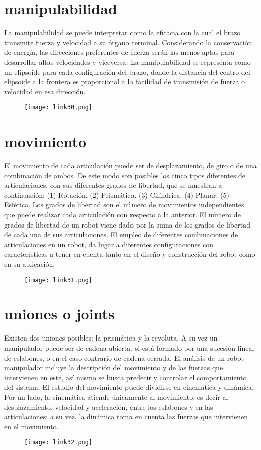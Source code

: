 \documentclass[11pt,a4paper,oldfontcommands,oneside]{memoir}
\begin{document}
\section{manipulabilidad}
La manipulabilidad se puede interpretar como la eficacia con la cual el brazo transmite fuerza y velocidad a su órgano terminal. Considerando la conservación de energía, las direcciones preferentes de fuerza serán las menos aptas para desarrollar altas velocidades y viceversa. 
La manipulabilidad se representa como un elipsoide para cada configuración del brazo, donde la distancia del centro del elipsoide a la frontera es proporcional a la facilidad de transmisión de fuerza o velocidad en esa dirección. 

\begin{figure}[h]
\texttt{[image: link30.png]}
\end{figure}

\section{movimiento}
El movimiento de cada articulación puede ser de desplazamiento, de giro o de una combinación de ambos. De este modo son posibles los cinco tipos diferentes de articulaciones, con sus diferentes grados de libertad, que se muestran a continuación: (1) Rotación. (2) Prismática. (3) Cilíndrica. (4) Planar. (5) Esférica. Los grados de libertad son el número de movimientos independientes que puede realizar cada articulación con respecto a la anterior. El número de grados de libertad de un robot viene dado por la suma de los grados de libertad de cada una de sus articulaciones. El empleo de diferentes combinaciones de articulaciones en un robot, da lugar a diferentes configuraciones con características a tener en cuenta tanto en el diseño y construcción del robot como en su aplicación.
\begin{figure}[h]
\texttt{[image: link31.png]}
\end{figure}

\section{uniones o joints}
Existen dos uniones posibles: la prismática y la revoluta. A su vez un manipulador puede ser de cadena abierta, si está formado por una sucesión lineal de eslabones, o en el caso contrario de cadena cerrada. El análisis de un robot manipulador incluye la descripción del movimiento y de las fuerzas que intervienen en este, así mismo se busca predecir y controlar el comportamiento del sistema. El estudio del movimiento puede dividirse en cinemática y dinámica. Por un lado, la cinemática atiende únicamente al movimiento, es decir al desplazamiento, velocidad y aceleración, entre los eslabones y en las articulaciones; a su vez, la dinámica toma en cuenta las fuerzas que intervienen en el movimiento.
\begin{figure}[h]
\texttt{[image: link32.png]}
\end{figure}
\end{document}
